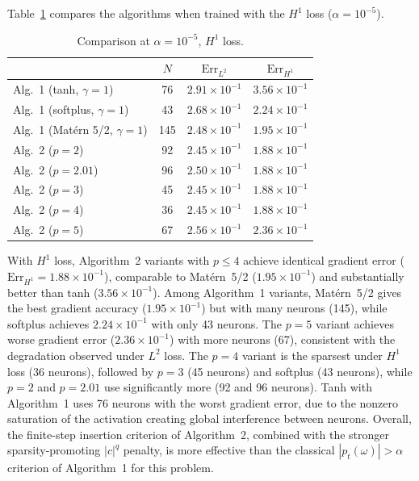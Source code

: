 \documentclass[12pt,fleqn]{amsart}
\theoremstyle{definition}
\begin{document}
Table~\ref{tab:comparison_h1} compares the algorithms when trained with the $H^1$ loss ($\alpha = 10^{-5}$).

\begin{table}[H]
\centering
\caption{Comparison at $\alpha = 10^{-5}$, $H^1$ loss.}
\label{tab:comparison_h1}
\begin{tabular}{l|ccc}
\hline
 & $N$ & $\mathrm{Err}_{L^2}$ & $\mathrm{Err}_{H^1}$ \\
\hline
Alg.~1 (tanh, $\gamma = 1$) & 76 & $2.91 \times 10^{-1}$ & $3.56 \times 10^{-1}$ \\
Alg.~1 (softplus, $\gamma = 1$) & 43 & $2.68 \times 10^{-1}$ & $2.24 \times 10^{-1}$ \\
Alg.~1 (Mat\'ern 5/2, $\gamma = 1$) & 145 & $2.48 \times 10^{-1}$ & $1.95 \times 10^{-1}$ \\
Alg.~2 ($p = 2$) & 92 & $2.45 \times 10^{-1}$ & $1.88 \times 10^{-1}$ \\
Alg.~2 ($p = 2.01$) & 96 & $2.50 \times 10^{-1}$ & $1.88 \times 10^{-1}$ \\
Alg.~2 ($p = 3$) & 45 & $2.45 \times 10^{-1}$ & $1.88 \times 10^{-1}$ \\
Alg.~2 ($p = 4$) & 36 & $2.45 \times 10^{-1}$ & $1.88 \times 10^{-1}$ \\
Alg.~2 ($p = 5$) & 67 & $2.56 \times 10^{-1}$ & $2.36 \times 10^{-1}$ \\
\hline
\end{tabular}
\end{table}

With $H^1$ loss, Algorithm~2 variants with $p \leqslant 4$ achieve identical gradient error ($\mathrm{Err}_{H^1} = 1.88 \times 10^{-1}$), comparable to Mat\'ern~5/2 ($1.95 \times 10^{-1}$) and substantially better than tanh ($3.56 \times 10^{-1}$).
Among Algorithm~1 variants, Mat\'ern~5/2 gives the best gradient accuracy ($1.95 \times 10^{-1}$) but with many neurons (145), while softplus achieves $2.24 \times 10^{-1}$ with only 43 neurons.
The $p = 5$ variant achieves worse gradient error ($2.36 \times 10^{-1}$) with more neurons (67), consistent with the degradation observed under $L^2$ loss.
The $p = 4$ variant is the sparsest under $H^1$ loss (36 neurons), followed by $p = 3$ (45 neurons) and softplus (43 neurons), while $p = 2$ and $p = 2.01$ use significantly more (92 and 96 neurons).
Tanh with Algorithm~1 uses 76 neurons with the worst gradient error, due to the nonzero saturation of the activation creating global interference between neurons.
Overall, the finite-step insertion criterion of Algorithm~2, combined with the stronger sparsity-promoting $|c|^q$ penalty, is more effective than the classical $|p_t(\omega)| > \alpha$ criterion of Algorithm~1 for this problem.
\end{document}
